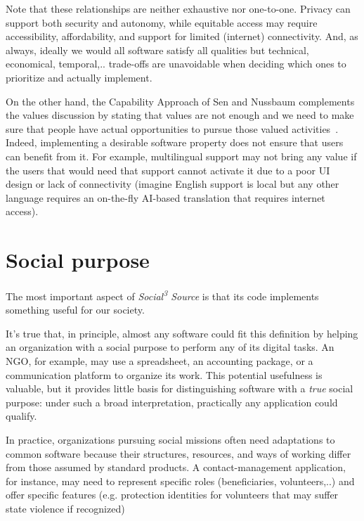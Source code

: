\documentclass[11pt,a4paper]{article}
\newcommand{\socialsource}{\texorpdfstring{\textit{Social\textsuperscript{3} Source}}{Social3 Source}}
\begin{document}
Note that these relationships are neither exhaustive nor one-to-one.
Privacy can support both security and autonomy, while equitable access may require accessibility, affordability, and support for limited (internet) connectivity.
And, as always, ideally we would all software satisfy all qualities but technical, economical, temporal,.. trade-offs are unavoidable when deciding which ones to prioritize and actually implement. 

On the other hand, the Capability Approach of Sen and Nussbaum complements the values discussion by stating that values are not enough and we need to make sure that people have actual opportunities to pursue those valued  activities~\cite{Nussbaum2003Capabilities}.
Indeed, implementing a desirable software property does not ensure that users can benefit from it.
For example, multilingual support may not bring any value if the users that would need that support cannot activate it due to a poor UI design or lack of connectivity (imagine English support is local but any other language requires an on-the-fly AI-based translation that requires internet access).

\section{Social purpose}
\label{sec:purpose}

The most important aspect of \socialsource{} is that its code implements something useful for our society.

It's true that, in principle, almost any software could fit this definition by helping an organization with a social purpose to perform any of its digital tasks. An NGO, for example, may use a spreadsheet, an accounting package, or a communication platform to organize its work.
This potential usefulness is valuable, but it provides little basis for distinguishing software with a \textit{true} social purpose: under such a broad interpretation, practically any application could qualify.

In practice, organizations pursuing social missions often need adaptations to common software because their structures, resources, and ways of working differ from those assumed by standard products.
A contact-management application, for instance, may need to represent specific roles (beneficiaries, volunteers,..) and offer specific features (e.g. protection identities for volunteers that may suffer state violence if recognized)
\end{document}
